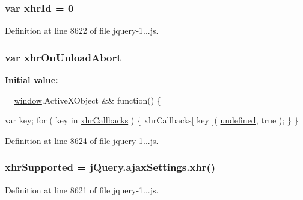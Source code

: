 \subsubsection[{xhr\+Id}]{\setlength{\rightskip}{0pt plus 5cm}var xhr\+Id = 0}\label{_scripts_2jquery-1_810_82_8js_aa23ed64cf7afc9b028419517bf23fcea}


Definition at line 8622 of file jquery-\/1...\+js.

\hypertarget{_scripts_2jquery-1_810_82_8js_a271c099ab18ab35c15cac2faa2a097aa}{}
\subsubsection[{xhr\+On\+Unload\+Abort}]{\setlength{\rightskip}{0pt plus 5cm}var xhr\+On\+Unload\+Abort}\label{_scripts_2jquery-1_810_82_8js_a271c099ab18ab35c15cac2faa2a097aa}
{\bfseries Initial value\+:}
\begin{DoxyCode}
= \hyperlink{obj_2_release_2_package_2_package_tmp_2_scripts_2jquery-1_810_82_8js_a04a8a2bbfa9c15500892b8e5033d625b}{window}.ActiveXObject && \textcolor{keyword}{function}() \{
        
        var key;
        \textcolor{keywordflow}{for} ( key in \hyperlink{obj_2_release_2_package_2_package_tmp_2_scripts_2jquery-1_810_82_8js_a068f27a70831ff3a9e0ffa79e063847f}{xhrCallbacks} ) \{
            xhrCallbacks[ key ]( \hyperlink{obj_2_release_2_package_2_package_tmp_2_scripts_2jquery-1_810_82_8js_a08113a236cc18d2a9d5ce27e638012be}{undefined}, true );
        \}
    \}
\end{DoxyCode}


Definition at line 8624 of file jquery-\/1...\+js.

\hypertarget{_scripts_2jquery-1_810_82_8js_afd7e72f2f357a5a8b17e46776a6283eb}{}
\subsubsection[{xhr\+Supported}]{\setlength{\rightskip}{0pt plus 5cm}xhr\+Supported = {\bf j\+Query.\+ajax\+Settings.\+xhr}()}\label{_scripts_2jquery-1_810_82_8js_afd7e72f2f357a5a8b17e46776a6283eb}


Definition at line 8621 of file jquery-\/1...\+js.

